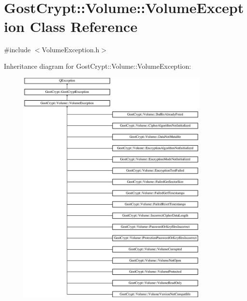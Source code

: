 \hypertarget{class_gost_crypt_1_1_volume_1_1_volume_exception}{}\section{Gost\+Crypt\+:\+:Volume\+:\+:Volume\+Exception Class Reference}
\label{class_gost_crypt_1_1_volume_1_1_volume_exception}


{\ttfamily \#include $<$Volume\+Exception.\+h$>$}

Inheritance diagram for Gost\+Crypt\+:\+:Volume\+:\+:Volume\+Exception\+:\begin{figure}[H]
\begin{center}
\leavevmode
\includegraphics[height=12.000000cm]{class_gost_crypt_1_1_volume_1_1_volume_exception}
\end{center}
\end{figure}

